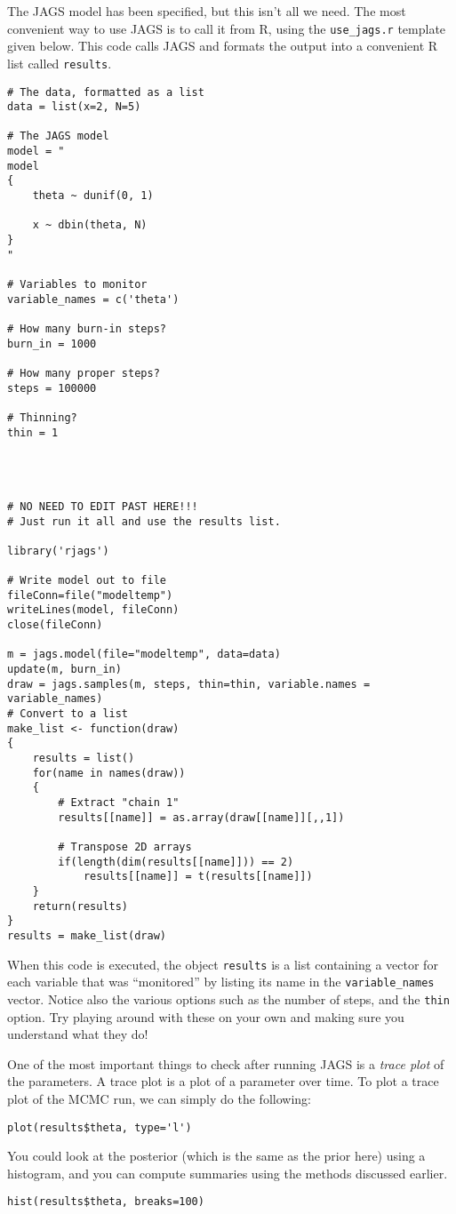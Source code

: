 The JAGS model has been specified, but this isn't all we need. The most
convenient way to use JAGS is to call it from R, using the {\tt use\_jags.r}
template given below.
This code calls JAGS and formats the
output into a convenient R list called {\tt results}.

\begin{framed}
\begin{verbatim}
# The data, formatted as a list
data = list(x=2, N=5)

# The JAGS model
model = "
model
{
    theta ~ dunif(0, 1)

    x ~ dbin(theta, N)
}
"

# Variables to monitor
variable_names = c('theta')

# How many burn-in steps?
burn_in = 1000

# How many proper steps?
steps = 100000

# Thinning?
thin = 1




# NO NEED TO EDIT PAST HERE!!!
# Just run it all and use the results list.

library('rjags')

# Write model out to file
fileConn=file("modeltemp")
writeLines(model, fileConn)
close(fileConn)

m = jags.model(file="modeltemp", data=data)
update(m, burn_in)
draw = jags.samples(m, steps, thin=thin, variable.names = variable_names)
# Convert to a list
make_list <- function(draw)
{
	results = list()
	for(name in names(draw))
	{
		# Extract "chain 1"
		results[[name]] = as.array(draw[[name]][,,1])
		
		# Transpose 2D arrays
		if(length(dim(results[[name]])) == 2)
			results[[name]] = t(results[[name]])
	}
	return(results)
}
results = make_list(draw)
\end{verbatim}
\end{framed}
When this code is executed, the object {\tt results} is a list containing a
vector for each variable that was ``monitored'' by listing its name in
the {\tt variable\_names} vector.
Notice also the various options such as the number of steps, and the {\tt thin}
option. Try playing around with these on your own and making sure you understand
what they do!

One of the most important things to check after running JAGS is a {\it trace
plot} of the parameters. A trace plot is a plot of a parameter over time.
To plot a trace plot of the MCMC run, we can simply do
the following:
\begin{framed}
\begin{verbatim}
plot(results$theta, type='l')
\end{verbatim}
\end{framed}
You could look at the posterior (which is the same as the prior here) using a
histogram, and you can compute summaries using the methods discussed earlier.

\begin{framed}
\begin{verbatim}
hist(results$theta, breaks=100)
\end{verbatim}
\end{framed}

